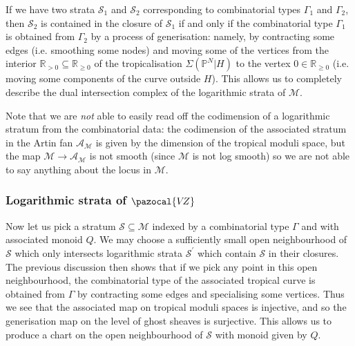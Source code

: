 \documentclass[11pt]{amsart}
\newcommand{\PP}{\mathbb P}
\newcommand{\VZ}{\pazocal{V\!Z}}
\renewcommand{\to}{\rightarrow}
\newcommand{\Acal}{\mathcal{A}}
\newcommand{\Scal}{\mathcal{S}}
\newcommand{\Mcal}{\mathcal{M}}
\newcommand{\RR}{\mathbb{R}}
\theoremstyle{definition}
\theoremstyle{definition}
\begin{document}
If we have two strata $\Scal_1$ and $\Scal_2$ corresponding to combinatorial types $\Gamma_1$ and $\Gamma_2$, then $\Scal_2$ is contained in the closure of $\Scal_1$ if and only if the combinatorial type $\Gamma_1$ is obtained from $\Gamma_2$ by a process of generisation: namely, by contracting some edges (i.e. smoothing some nodes) and moving some of the vertices from the interior $\RR_{>0} \subseteq \RR_{\geq 0}$ of the tropicalisation $\Sigma(\PP^N|H)$ to the vertex $0 \in \RR_{\geq 0}$ (i.e. moving some components of the curve outside $H$). This allows us to completely describe the dual intersection complex of the logarithmic strata of $\Mcal$.

Note that we are \emph{not} able to easily read off the codimension of a logarithmic stratum from the combinatorial data: the codimension of the associated stratum in the Artin fan $\Acal_\Mcal$ is given by the dimension of the tropical moduli space, but the map $\Mcal\to\Acal_\Mcal$ is not smooth (since $\Mcal$ is not log smooth) so we are not able to say anything about the locus in $\Mcal$. 

\subsubsection{Logarithmic strata of $\VZ$}
Now let us pick a stratum $\Scal \subseteq \Mcal$ indexed by a combinatorial type $\Gamma$ and with associated monoid $Q$. We may choose a sufficiently small open neighbourhood of $\Scal$ which only intersects logarithmic strata $\Scal^\prime$ which contain $\Scal$ in their closures. The previous discussion then shows that if we pick any point in this open neighbourhood, the combinatorial type of the associated tropical curve is obtained from $\Gamma$ by contracting some edges and specialising some vertices. Thus we see that the associated map on tropical moduli spaces is injective, and so the generisation map on the level of ghost sheaves is surjective. This allows us to produce a chart on the open neighbourhood of $\Scal$ with monoid given by $Q$.
\end{document}
